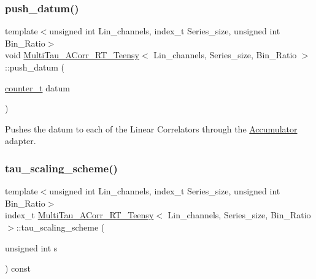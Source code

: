 \mbox{\label{classMultiTau__ACorr__RT__Teensy_a1ad6126310c987f53a0ec7ab3ae03a12}} 
\subsubsection{\texorpdfstring{push\+\_\+datum()}{push\_datum()}}
{\footnotesize\ttfamily template$<$unsigned int Lin\+\_\+channels, index\+\_\+t Series\+\_\+size, unsigned int Bin\+\_\+\+Ratio$>$ \\
void \hyperlink{classMultiTau__ACorr__RT__Teensy}{Multi\+Tau\+\_\+\+A\+Corr\+\_\+\+R\+T\+\_\+\+Teensy}$<$ Lin\+\_\+channels, Series\+\_\+size, Bin\+\_\+\+Ratio $>$\+::push\+\_\+datum (\begin{DoxyParamCaption}\item[{\hyperlink{types_8hpp_ac89ac912f524b3e3fa3720ea55fec966}{counter\+\_\+t}}]{datum }\end{DoxyParamCaption})\hspace{0.3cm}{\ttfamily [inline]}}



Pushes the datum to each of the Linear Correlators through the \hyperlink{classAccumulator}{Accumulator} adapter. 

\mbox{\label{classMultiTau__ACorr__RT__Teensy_af90bc219b8b9dc316c56efd7c74aae6f}} 
\subsubsection{\texorpdfstring{tau\+\_\+scaling\+\_\+scheme()}{tau\_scaling\_scheme()}}
{\footnotesize\ttfamily template$<$unsigned int Lin\+\_\+channels, index\+\_\+t Series\+\_\+size, unsigned int Bin\+\_\+\+Ratio$>$ \\
index\+\_\+t \hyperlink{classMultiTau__ACorr__RT__Teensy}{Multi\+Tau\+\_\+\+A\+Corr\+\_\+\+R\+T\+\_\+\+Teensy}$<$ Lin\+\_\+channels, Series\+\_\+size, Bin\+\_\+\+Ratio $>$\+::tau\+\_\+scaling\+\_\+scheme (\begin{DoxyParamCaption}\item[{unsigned int}]{s }\end{DoxyParamCaption}) const\hspace{0.3cm}{\ttfamily [inline]}}



